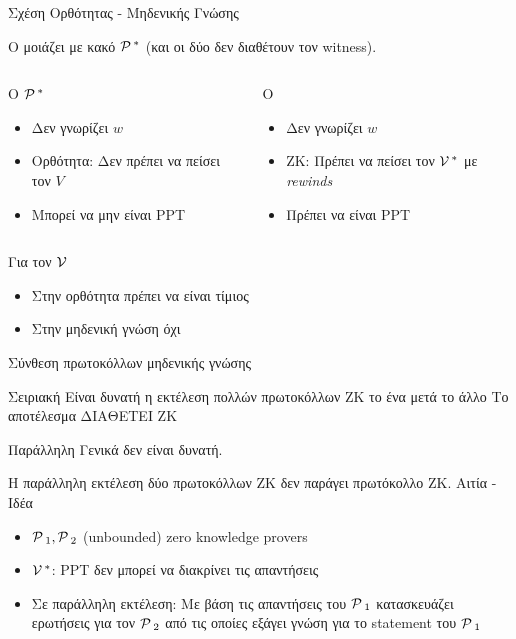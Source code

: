 \documentclass[10pt,handout]{beamer}
\begin{document}
\begin{frame}{Σχέση Oρθότητας - Μηδενικής Γνώσης}

O \siml μοιάζει με κακό $\mathcal{P}\,^*$ (και οι δύο δεν διαθέτουν τον witness). \\
\medskip

\begin{columns}

\begin{block}{Ο $\mathcal{P}\,^*$}
	\begin{itemize}
		\item Δεν γνωρίζει $w$
		\item Ορθότητα: Δεν πρέπει να πείσει τον $V$
		\item Μπορεί να μην είναι PPT
	\end{itemize}
\end{block}
 
\begin{block}{Ο \siml}
\begin{itemize}
	\item Δεν γνωρίζει $w$
	\item ΖΚ: Πρέπει να πείσει τον $\mathcal{V}\,^*$ με \emph{rewinds}
	\item Πρέπει να είναι PPT
\end{itemize}
\end{block}
\end{columns}

\medskip
\begin{block}{Για τον $\mathcal{V}\,$}
\begin{itemize}
\item Στην ορθότητα πρέπει να είναι τίμιος
\item Στην μηδενική γνώση όχι
\end{itemize}
\end{block}

\end{frame}


\begin{frame}{Σύνθεση πρωτοκόλλων μηδενικής γνώσης}

	\begin{block}{Σειριακή}
		Είναι δυνατή η εκτέλεση πολλών πρωτοκόλλων ΖΚ το ένα  μετά το άλλο
		Το αποτέλεσμα ΔΙΑΘΕΤΕΙ ZK
	\end{block}
	\pause
	\begin{block}{Παράλληλη}
	Γενικά \alert{δεν} είναι δυνατή. 

	Η παράλληλη εκτέλεση δύο πρωτοκόλλων ΖΚ δεν παράγει πρωτόκολλο ΖΚ.
	\pause
	{Αιτία - Ιδέα}
	\begin{itemize}
		\item $\mathcal{P}\,_1, \mathcal{P}\,_2$ (unbounded) zero knowledge provers
		\item $\mathcal{V}\,^*$: PPT δεν μπορεί να διακρίνει τις απαντήσεις 
		\item Σε παράλληλη εκτέλεση: Με βάση τις απαντήσεις του $\mathcal{P}\,_1$ κατασκευάζει ερωτήσεις για τον $\mathcal{P}\,_2$ από τις οποίες εξάγει γνώση για το statement του $\mathcal{P}\,_1$		
	\end{itemize}
		
	\end{block}
\end{frame}
\end{document}
